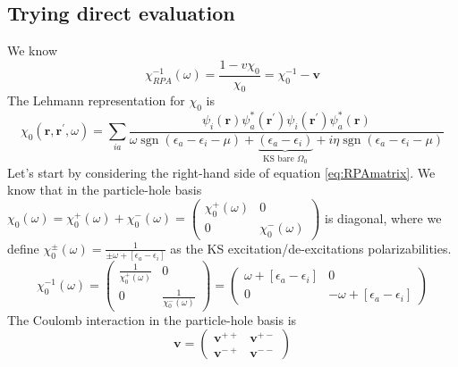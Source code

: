 \documentclass[12pt]{article}
\begin{document}
\subsection{Trying direct evaluation}
We know
\begin{equation}
    \chi_{RPA}^{-1}(\omega) = \frac{1-v \chi_0}{\chi_0} = \chi_0^{-1} - \mathbf{v}
\label{eq:RPAmatrix}
\end{equation}
The Lehmann representation for $\chi_0$ is
\begin{equation}
    \chi_{0}\left(\mathbf{r}, \mathbf{r}^{\prime}, \omega\right)=\sum_{ia}\frac{\psi_{i}(\mathbf{r}) \psi_{a}^{*}(\mathbf{r}^{\prime}) \psi_{i}(\mathbf{r}^{\prime}) \psi_{a}^{*}(\mathbf{r})}{\omega\operatorname{sgn}\left(\epsilon_{a}-\epsilon_{i} - \mu\right)+\underbrace{\left(\epsilon_{a}-\epsilon_{i}\right)}_{\text{KS bare } \Omega _0}+i \eta \operatorname{sgn}\left(\epsilon_{a}-\epsilon_{i} - \mu\right)}
\label{eq:chi0Lehmann}
\end{equation}
Let's start by considering the right-hand side of equation \ref{eq:RPAmatrix}. We know that in the particle-hole basis $\chi_0(\omega )= \chi_0^{+}(\omega ) + \chi_0^{-}(\omega ) = \begin{pmatrix}
    \chi_0^{+}(\omega ) & 0 \\
    0 & \chi_0^{-}(\omega )
\end{pmatrix}$ is diagonal, where we define $\chi_0^{\pm}(\omega ) = \frac{1}{\pm\omega + \left[\epsilon_a - \epsilon_i\right]}$ as the KS excitation/de-excitations polarizabilities.
\begin{equation}
    \chi_0^{-1}(\omega ) = \begin{pmatrix}
        \frac{1}{\chi_0^{+}(\omega )} & 0 \\
        0 & \frac{1}{\chi_0^{-}(\omega )}
    \end{pmatrix}
= \begin{pmatrix}
    \omega + \left[\epsilon_a - \epsilon_i\right] & 0 \\
    0 & -\omega + \left[\epsilon_a - \epsilon_i\right]
\end{pmatrix}
\end{equation}
The Coulomb interaction in the particle-hole basis is
\begin{equation}
    \mathbf{v} = \begin{pmatrix}
        \mathbf{v}^{++} & \mathbf{v}^{+-} \\
        \mathbf{v}^{-+} & \mathbf{v}^{--}
    \end{pmatrix}
\end{equation}
\end{document}
